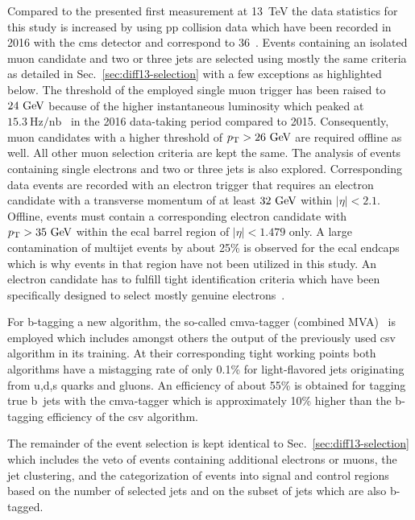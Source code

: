Compared to the presented first measurement at 13~TeV the data statistics for this study is increased by using \gls{pp} collision data which have been recorded in 2016 with the \gls{cms} detector and correspond to 36~\invfb. Events containing an isolated muon candidate and two or three jets are selected using mostly the same criteria as detailed in Sec.~\ref{sec:diff13-selection} with a few exceptions as highlighted below. The threshold of the employed single muon trigger has been raised to $24~\textrm{GeV}$ because of the higher instantaneous luminosity which peaked at $15.3~\mathrm{Hz}/\mathrm{nb}$~\cite{lumipublic} in the 2016 data-taking period compared to 2015. Consequently, muon candidates with a higher threshold of $p_\textrm{T}>26~\textrm{GeV}$ are required offline as well. All other muon selection criteria are kept the same. The analysis of events containing single electrons and two or three jets is also explored. Corresponding data events are recorded with an electron trigger that requires an electron candidate with a transverse momentum of at least $32~\textrm{GeV}$ within $|\eta|<2.1$. Offline, events must contain a corresponding electron candidate with $p_\textrm{T}>35~\textrm{GeV}$ within the \gls{ecal} barrel region of $|\eta|<1.479$ only. A large contamination of multijet events by about 25\% is observed for the \gls{ecal} endcaps which is why events in that region have not been utilized in this study. An electron candidate has to fulfill tight identification criteria which have been specifically designed to select mostly genuine electrons~\cite{CMS-DP-2017-004}.

For b-tagging a new algorithm, the so-called \gls{cmva}-tagger (combined MVA)~\cite{CMS-PAS-BTV-15-001} is employed which includes amongst others the output of the previously used \gls{csv} algorithm in its training. At their corresponding tight working points both algorithms have a mistagging rate of only 0.1\% for light-flavored jets originating from u,d,s quarks and gluons. An efficiency of about 55\% is obtained for tagging true b~jets with the \gls{cmva}-tagger which is approximately 10\% higher than the b-tagging efficiency of the \gls{csv} algorithm. 

The remainder of the event selection is kept identical to Sec.~\ref{sec:diff13-selection} which includes the veto of events containing additional electrons or muons, the jet clustering, and the categorization of events into signal and control regions based on the number of selected jets and on the subset of jets which are also b-tagged.

